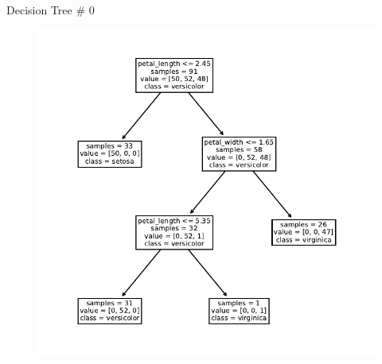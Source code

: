 \documentclass{beamer}
\begin{document}
%					


\begin{frame}{Decision Tree \# 0}
\begin{figure}
	\includegraphics[scale=0.7]{tree-0.pdf}
\end{figure}
\end{frame}
\end{document}
